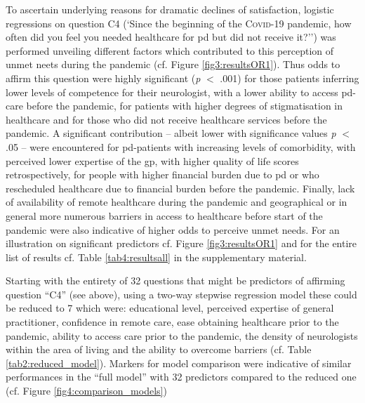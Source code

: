 \documentclass{bmcart}
\begin{document}
To ascertain underlying reasons for dramatic declines of satisfaction, logistic regressions on question C4 (`Since the beginning of the \textsc{Covid}-19 pandemic, how often did you feel you needed healthcare for \acl{pd} but did not receive it?'') was performed unveiling different factors which contributed to this perception of unmet neets during the pandemic (cf. Figure \ref{fig3:resultsOR1}). Thus odds to affirm this question were highly significant (\textit{p} $<$ .001) for those patients inferring lower levels of competence for their neurologist, with a lower ability to access \ac{pd}-care before the pandemic, for patients with higher degrees of stigmatisation in healthcare and for those who did not receive healthcare services before the pandemic. A significant contribution -- albeit lower with significance values \textit{p} $<$ .05 --  were encountered for \ac{pd}-patients with increasing levels of comorbidity, with perceived lower expertise of the \ac{gp}, with higher quality of life scores retrospectively, for people with higher financial burden due to \ac{pd} or who rescheduled healthcare due to financial burden before the pandemic. Finally, lack of availability of remote healthcare during the pandemic and geographical or in general more numerous barriers in access to healthcare before start of the pandemic were also indicative of higher odds to perceive unmet needs. For an illustration on significant predictors cf. Figure \ref{fig3:resultsOR1} and for the entire list of results cf. Table  \ref{tab4:resultsall} in the supplementary material. 


Starting with the entirety of 32 questions that might be predictors of affirming question ``C4'' (see above), using a two-way stepwise regression model these could be reduced to 7 which were: educational level, perceived expertise of general practitioner, confidence in remote care, ease obtaining healthcare prior to the pandemic, ability to access care prior to the pandemic, the density of neurologists within the area of living and the ability to overcome barriers (cf. Table \ref{tab2:reduced_model}). Markers for model comparison were indicative of similar performances in the ``full model'' with 32 predictors compared to the reduced one (cf. Figure \ref{fig4:comparison_models})
\end{document}
